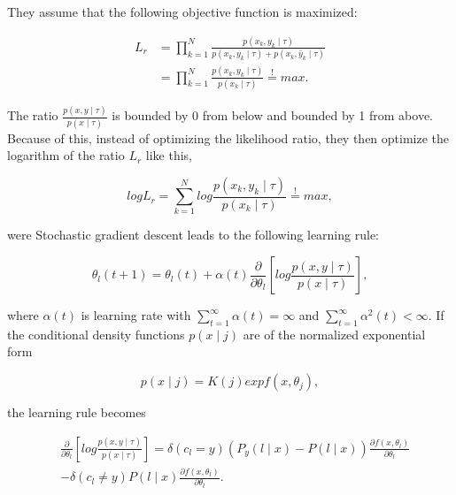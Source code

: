 \documentclass[12pt,oneside,a4paper,parskip]{scrbook}
\begin{document}
They assume that the following objective function is maximized:

\begin{equation}
  \begin{split}
    L_r &= \displaystyle\prod_{k=1}^{N} \frac{p(x_k, y_k\mid\tau)}{p(x_k, y_k\mid\tau) + p(x_k, \bar{y}_k\mid\tau)} \\
        &= \displaystyle\prod_{k=1}^{N} \frac{p(x_k, y_k\mid\tau)}{p(x_k\mid\tau)}  \overset{!}{=} max.
  \end{split}
\end{equation}

The ratio $\frac{p(x, y\mid\tau)}{p(x\mid\tau)}$ is bounded by 0 from below and bounded by 1 from above. Because of this, 
instead of optimizing the likelihood ratio, they then optimize the 
logarithm of the ratio $L_r$ like this,

\begin{equation}
    log L_r = \displaystyle\sum_{k=1}^{N}log\frac{p(x_k, y_k\mid\tau)}{p(x_k\mid\tau)} \overset{!}{=} max,
\end{equation}

were Stochastic gradient descent leads to the following learning rule:

\begin{equation}
  \theta_l(t + 1) = \theta_l(t) + \alpha(t)\frac{\partial}{\partial\theta_l} [log \frac{p(x, y\mid\tau)}{p(x\mid\tau)}]
  \label{equ:RSLVQ_1},
\end{equation}

where $\alpha(t)$ is learning rate with $\sum_{t=1}^{\infty} \alpha(t) = \infty$ and $\sum_{t=1}^{\infty} \alpha^2(t) < \infty$.
If the conditional density functions $p(x\mid j)$ are of the normalized exponential form

\begin{equation}
  p(x\mid j) = K(j) exp f(x, \theta_j), 
\end{equation}

the learning rule becomes

\begin{equation}
  \begin{split}
    &\frac{\partial}{\partial\theta_l} [log \frac{p(x, y\mid\tau)}{p(x\mid\tau)}] = \delta(c_l = y)(P_y(l\mid x) - P(l\mid x))\frac{\partial f(x, \theta_l) }{\partial\theta_l} \\
    &- \delta(c_l \neq y) P(l\mid x)\frac{\partial f(x, \theta_l) }{\partial\theta_l}.
  \end{split}
\end{equation}
\end{document}
